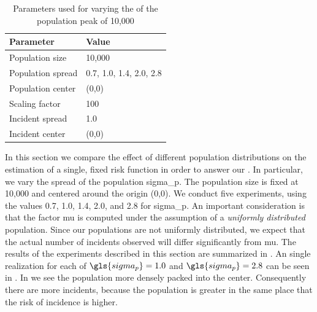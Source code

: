 \begin{table}[htbp]
    \centering
    \begin{tabular}{ll}
        \toprule
        Parameter & Value \\
        \midrule
        Population size & 10,000 \\
        Population \gls{spread} & 0.7, 1.0, 1.4, 2.0, 2.8 \\
        Population center & (0,0) \\
        Scaling factor & 100 \\
        Incident \gls{spread} & 1.0 \\
        Incident center & (0,0) \\
        \bottomrule
    \end{tabular}
    \caption{Parameters used for varying the  of the population peak of 10,000}
    \label{tab:params:pop_spread}
\end{table}

In this section
we compare the effect of different population distributions on the estimation of a single,
fixed risk function in order to answer our .
In particular, we vary the \gls{spread} of the population \gls{sigma_p}.
The population size is fixed at 10,000 and centered around the origin (0,0).
We conduct five experiments, using the values 0.7, 1.0, 1.4, 2.0, and 2.8 for \gls{sigma_p}.
An important consideration is that the \gls{factor} \gls{mu} is computed under the assumption of a \textit{uniformly distributed} population.
Since our populations are not uniformly distributed, we expect that the actual number of incidents observed will differ significantly from \gls{mu}.
The results of the experiments described in this section are summarized in .
An single realization for each of $\gls{sigma_p} = 1.0$ and $\gls{sigma_p} = 2.8$ can be seen in .
In  we see the population more densely packed into the center.
Consequently there are more incidents,
because the population is greater in the same place that the risk of incidence is higher.

